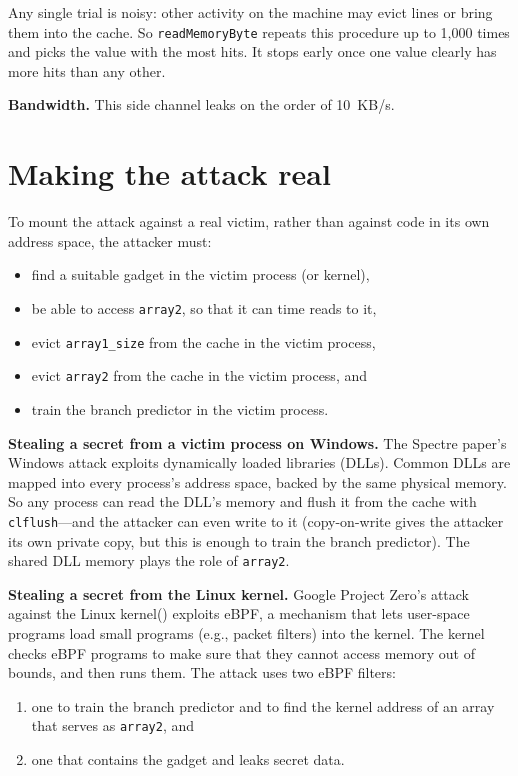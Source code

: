 \documentclass[
  letterpaper,
]{scrbook}
\theoremstyle{definition}
\theoremstyle{plain}
\theoremstyle{plain}
\theoremstyle{remark}
\begin{document}
Any single trial is noisy: other activity on the machine may evict lines
or bring them into the cache. So \texttt{readMemoryByte} repeats this
procedure up to 1,000 times and picks the value with the most hits. It
stops early once one value clearly has more hits than any other.

\textbf{Bandwidth.} This side channel leaks on the order of 10~KB/s.

\section{Making the attack real}\label{making-the-attack-real}

To mount the attack against a real victim, rather than against code in
its own address space, the attacker must:

\begin{itemize}
\item
  find a suitable gadget in the victim process (or kernel),
\item
  be able to access \texttt{array2}, so that it can time reads to it,
\item
  evict \texttt{array1\_size} from the cache in the victim process,
\item
  evict \texttt{array2} from the cache in the victim process, and
\item
  train the branch predictor in the victim process.
\end{itemize}

\textbf{Stealing a secret from a victim process on Windows.} The Spectre
paper's Windows attack exploits dynamically loaded libraries (DLLs).
Common DLLs are mapped into every process's address space, backed by the
same physical memory. So any process can read the DLL's memory and flush
it from the cache with \texttt{clflush}---and the attacker can even
write to it (copy-on-write gives the attacker its own private copy, but
this is enough to train the branch predictor). The shared DLL memory
plays the role of \texttt{array2}.

\textbf{Stealing a secret from the Linux kernel.} Google Project Zero's
attack against the Linux kernel() exploits eBPF, a mechanism that lets user-space programs load
small programs (e.g., packet filters) into the kernel. The kernel checks
eBPF programs to make sure that they cannot access memory out of bounds,
and then runs them. The attack uses two eBPF filters:

\begin{enumerate}
\def\labelenumi{\arabic{enumi}.}
\item
  one to train the branch predictor and to find the kernel address of an
  array that serves as \texttt{array2}, and
\item
  one that contains the gadget and leaks secret data.
\end{enumerate}
\end{document}
